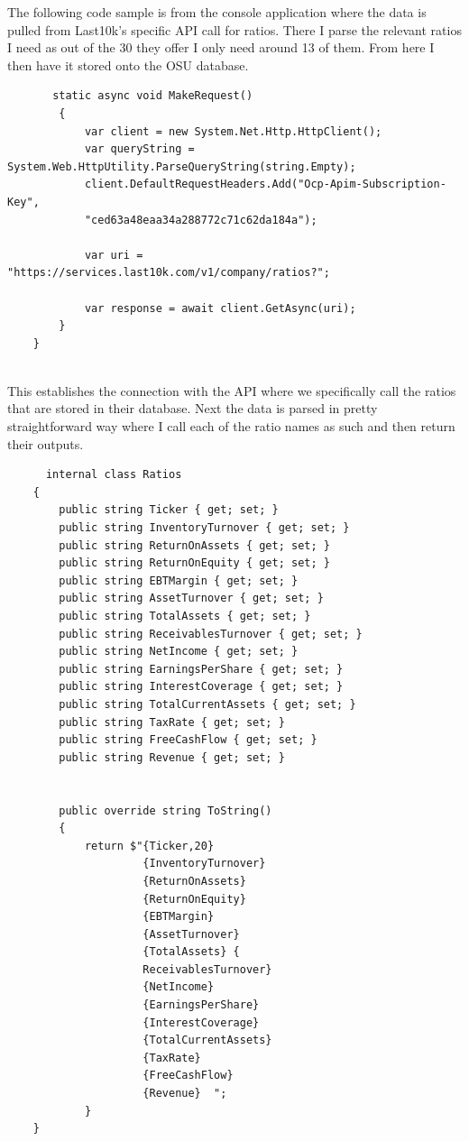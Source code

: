 \documentclass[letterpaper,10pt,titlepage,journal,compsoc,draftclsnofoot,onecolumn]{IEEEtran}
\begin{document}
The following code sample is from the console application where the data is pulled from Last10k's specific API call for ratios. There I parse the relevant ratios I need as out of the 30 they offer I only need around 13 of them. From here I then have it stored onto the OSU database. 

       \begin{lstlisting} 
       static async void MakeRequest()
        {
            var client = new System.Net.Http.HttpClient();
            var queryString = System.Web.HttpUtility.ParseQueryString(string.Empty);
            client.DefaultRequestHeaders.Add("Ocp-Apim-Subscription-Key",
            "ced63a48eaa34a288772c71c62da184a");

            var uri = "https://services.last10k.com/v1/company/ratios?";

            var response = await client.GetAsync(uri);
        }
    }
       
       \end{lstlisting} 
       
      This establishes the connection with the API where we specifically call the ratios that are stored in their database. Next the data is parsed in pretty straightforward way where I call each of the ratio names as such and then return their outputs. 
      
      \begin{lstlisting}
      internal class Ratios
    {
        public string Ticker { get; set; }
        public string InventoryTurnover { get; set; } 
        public string ReturnOnAssets { get; set; }
        public string ReturnOnEquity { get; set; }
        public string EBTMargin { get; set; }
        public string AssetTurnover { get; set; }
        public string TotalAssets { get; set; }
        public string ReceivablesTurnover { get; set; }
        public string NetIncome { get; set; }
        public string EarningsPerShare { get; set; }
        public string InterestCoverage { get; set; }
        public string TotalCurrentAssets { get; set; }
        public string TaxRate { get; set; }
        public string FreeCashFlow { get; set; }
        public string Revenue { get; set; }


        public override string ToString()
        {
            return $"{Ticker,20}
                     {InventoryTurnover} 
                     {ReturnOnAssets} 
                     {ReturnOnEquity} 
                     {EBTMargin} 
                     {AssetTurnover} 
                     {TotalAssets} {
                     ReceivablesTurnover} 
                     {NetIncome} 
                     {EarningsPerShare} 
                     {InterestCoverage} 
                     {TotalCurrentAssets} 
                     {TaxRate} 
                     {FreeCashFlow} 
                     {Revenue}  "; 
            }
    }
    
      \end{lstlisting} 
      
\end{document}
